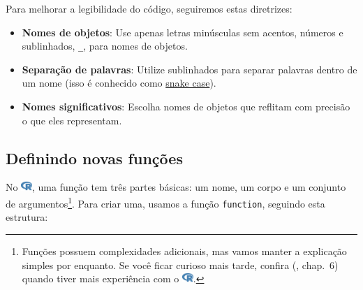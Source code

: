 \documentclass[
  letterpaper,
]{book}
\theoremstyle{definition}
\theoremstyle{plain}
\theoremstyle{remark}
\begin{document}
\begin{tcolorbox}[enhanced jigsaw, coltitle=black, titlerule=0mm, opacitybacktitle=0.6, title=\textcolor{quarto-callout-important-color}{\faExclamation}\hspace{0.5em}{Importante}, bottomrule=.15mm, colbacktitle=quarto-callout-important-color!10!white, colback=white, toptitle=1mm, arc=.35mm, left=2mm, breakable, rightrule=.15mm, opacityback=0, colframe=quarto-callout-important-color-frame, leftrule=.75mm, bottomtitle=1mm, toprule=.15mm]

Para melhorar a legibilidade do código, seguiremos estas diretrizes:

\begin{itemize}
\item
  \textbf{Nomes de objetos}: Use apenas letras minúsculas sem acentos,
  números e sublinhados, \texttt{\_}, para nomes de objetos.
\item
  \textbf{Separação de palavras}: Utilize sublinhados para separar
  palavras dentro de um nome (isso é conhecido como
  \href{https://en.wikipedia.org/wiki/Snake_case}{snake case}).
\item
  \textbf{Nomes significativos}: Escolha nomes de objetos que reflitam
  com precisão o que eles representam.
\end{itemize}

\end{tcolorbox}

\subsection{Definindo novas
funções}\label{definindo-novas-funuxe7uxf5es}

No
\includegraphics[width=1.13em,height=1em]{getting_started_with_r_files/figure-pdf/fa-icon-9b00320707d42527dde67262afb33ded.pdf},
uma função tem três partes básicas: um nome, um corpo e um conjunto de
argumentos\footnote{Funções possuem complexidades adicionais, mas vamos
  manter a explicação simples por enquanto. Se você ficar curioso mais
  tarde, confira (,
  chap.~6) quando tiver mais experiência com o
  \includegraphics[width=1.13em,height=1em]{getting_started_with_r_files/figure-pdf/fa-icon-9b00320707d42527dde67262afb33ded.pdf}.}.
Para criar uma, usamos a função \texttt{function}, seguindo esta
estrutura:
\end{document}

